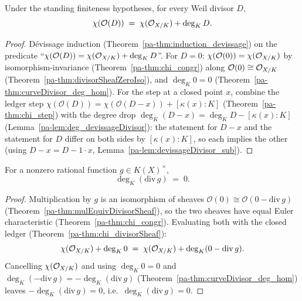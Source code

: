 \begin{theorem}
  \label{pa-thm:chi_divisorSheaf}
  \leanok

  Under the standing finiteness hypotheses, for every Weil divisor \(D\),
  \[
    \chi(\mathcal O(D)) \;=\; \chi(\mathcal{O}_{X/K}) + \deg_K D .
  \]
\end{theorem}
\begin{proof}
  \leanok
  Dévissage induction (Theorem~\ref{pa-thm:induction_devissage}) on the predicate
  ``\(\chi(\mathcal O(D)) = \chi(\mathcal{O}_{X/K}) + \deg_K D\)''. For \(D = 0\):
  \(\chi(\mathcal O(0)) = \chi(\mathcal{O}_{X/K})\) by isomorphism-invariance
  (Theorem~\ref{pa-thm:chi_congr}) along \(\mathcal O(0) \cong \mathcal{O}_{X/K}\)
  (Theorem~\ref{pa-thm:divisorSheafZeroIso}), and \(\deg_K 0 = 0\)
  (Theorem~\ref{pa-thm:curveDivisor_deg_hom}). For the step at a closed point \(x\), combine the
  ledger step \(\chi(\mathcal O(D)) = \chi(\mathcal O(D-x)) + [\kappa(x):K]\)
  (Theorem~\ref{pa-thm:chi_step}) with the degree drop
  \(\deg_K(D-x) = \deg_K D - [\kappa(x):K]\) (Lemma~\ref{pa-lem:deg_devissageDivisor}): the
  statement for \(D-x\) and the statement for \(D\) differ on both sides by \([\kappa(x):K]\), so
  each implies the other (using \(D - x = D - 1\cdot x\),
  Lemma~\ref{pa-lem:devissageDivisor_sub}).
\end{proof}

\begin{theorem}
  \label{pa-thm:deg_divOf}
  \leanok

  For a nonzero rational function \(g \in K(X)^\times\),
  \[
    \deg_K(\mathrm{div}\, g) \;=\; 0 .
  \]
\end{theorem}
\begin{proof}
  \leanok
  Multiplication by \(g\) is an isomorphism of sheaves
  \(\mathcal O(0) \cong \mathcal O(0 - \mathrm{div}\, g)\)
  (Theorem~\ref{pa-thm:mulEquivDivisorSheaf}), so the two sheaves have equal Euler characteristic
  (Theorem~\ref{pa-thm:chi_congr}). Evaluating both with the closed ledger
  (Theorem~\ref{pa-thm:chi_divisorSheaf}):
  \[
    \chi(\mathcal{O}_{X/K}) + \deg_K 0 \;=\; \chi(\mathcal{O}_{X/K}) + \deg_K(0 - \mathrm{div}\, g).
  \]
  Cancelling \(\chi(\mathcal{O}_{X/K})\) and using \(\deg_K 0 = 0\) and
  \(\deg_K(-\mathrm{div}\, g) = -\deg_K(\mathrm{div}\, g)\)
  (Theorem~\ref{pa-thm:curveDivisor_deg_hom}) leaves \(-\deg_K(\mathrm{div}\, g) = 0\), i.e.\
  \(\deg_K(\mathrm{div}\, g) = 0\).
\end{proof}

